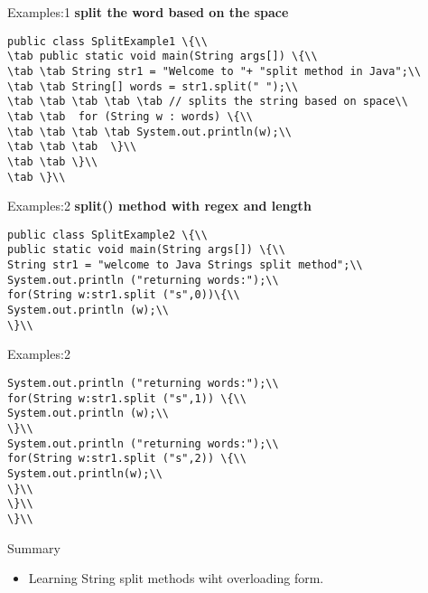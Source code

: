 \documentclass[aspectratio=169,14pt,usenames,dvipsnames]{beamer}
\newcommand\tab[1][1cm]{\hspace*{#1}}
\begin{document}
\begin{frame}{Examples:1}
\textbf{split the word based on the space}\\
\begin{lstlisting}
public class SplitExample1 \{\\
\tab public static void main(String args[]) \{\\
\tab \tab String str1 = "Welcome to "+ "split method in Java";\\
\tab \tab String[] words = str1.split(" ");\\
\tab \tab \tab \tab \tab // splits the string based on space\\
\tab \tab  for (String w : words) \{\\
\tab \tab \tab \tab System.out.println(w);\\
\tab \tab \tab  \}\\
\tab \tab \}\\
\tab \}\\
\end{lstlisting}
\end{frame}



\begin{frame}{Examples:2}
\textbf{split() method with regex and length}\\
\begin{lstlisting}
public class SplitExample2 \{\\
public static void main(String args[]) \{\\
String str1 = "welcome to Java Strings split method";\\
System.out.println ("returning words:");\\
for(String w:str1.split ("s",0))\{\\
System.out.println (w);\\
\}\\
\end{lstlisting}
\end{frame}

\begin{frame}{Examples:2}
\begin{lstlisting}
System.out.println ("returning words:");\\
for(String w:str1.split ("s",1)) \{\\
System.out.println (w);\\
\}\\
System.out.println ("returning words:");\\
for(String w:str1.split ("s",2)) \{\\
System.out.println(w);\\
\}\\
\}\\
\}\\
\end{lstlisting}
\end{frame}

\begin{frame}{Summary}
\begin{itemize}
    \item Learning String split methods wiht overloading form.
\end{itemize}
\end{frame}
\end{document}
